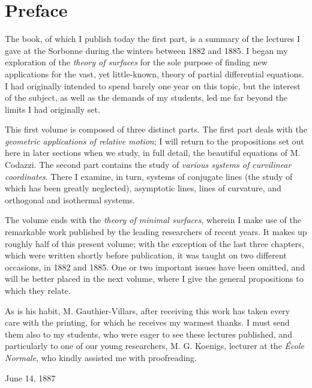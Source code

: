 \newcommand{\tmtextit}[1]{{\itshape{#1}}}

\chapter*{Preface}

The book, of which I publish today the first part, is a summary of the
lectures I gave at the Sorbonne during the winters between 1882 and 1885. I
began my exploration of the \tmtextit{theory of surfaces} for the sole purpose
of finding new applications for the vast, yet little-known, theory of partial
differential equations. I had originally intended to spend barely one year on
this topic, but the interest of the subject, as well as the demands of my
students, led me far beyond the limits I had originally set.

This first volume is composed of three distinct parts. The first part deals
with the \tmtextit{geometric applications of relative motion}; I will return
to the propositions set out here in later sections when we study, in full
detail, the beautiful equations of M. Codazzi. The second part contains the
study of \tmtextit{various systems of curvilinear coordinates}. There I
examine, in turn, systems of conjugate lines (the study of which has been
greatly neglected), asymptotic lines, lines of curvature, and orthogonal and
isothermal systems.

The volume ends with the \tmtextit{theory of minimal surfaces}, wherein I make
use of the remarkable work published by the leading researchers of recent
years. It makes up roughly half of this present volume; with the exception of
the last three chapters, which were written shortly before publication, it was
taught on two different occasions, in 1882 and 1885. One or two important
issues have been omitted, and will be better placed in the next volume, where
I give the general propositions to which they relate.

As is his habit, M. Gauthier-Villars, after receiving this work has taken
every care with the printing, for which he receives my warmest thanks. I must
send them also to my students, who were eager to see these lectures published,
and particularly to one of our young researchers, M. G. Koenigs, lecturer at
the \tmtextit{\'Ecole Normale}, who kindly assisted me with proofreading.

\begin{flushright}
  {\small{June{\small{}} 14, 1887}}
\end{flushright}
